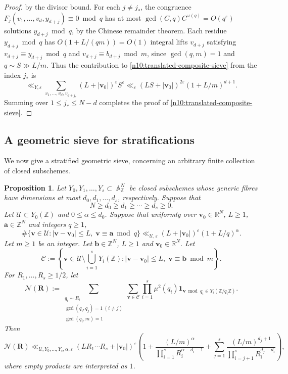 \documentclass[a4paper,11pt, twoside,reqno]{amsart}
\theoremstyle{plain}
\newtheorem{prop}[thm]{Proposition}
\theoremstyle{definition}
\theoremstyle{remark}
\newcommand{\bfa}{\bm{a}}
\newcommand{\bfb}{\bm{b}}
\newcommand{\bfv}{\bm{v}}
\newcommand{\ZZ}{\mathbb{Z}}
\newcommand{\RR}{\mathbb{R}}
\DeclareMathOperator{\A}{\mathbb{A}}
\newcommand{\ve}{\varepsilon}
\renewcommand{\le}{\leqslant}
\renewcommand{\ge}{\geqslant}
\numberwithin{equation}{section}
\begin{document}
\begin{proof}
by the divisor bound.
For each $j\ne j_*$, the congruence $F_j(v_1,\dots,v_d,y_{d+j}) \equiv 0\bmod{q}$
has at most $\gcd(C,q) C^{\omega(q)}=O(q^\ve)$ solutions $y_{d+j}\bmod{q}$,
by the Chinese remainder theorem.
Each residue $y_{d+j}\bmod{q}$ has $O(1 + L/(qm)) = O(1)$
integral lifts $v_{d+j}$ satisfying
$v_{d+j}\equiv y_{d+j}\bmod q$ and
$v_{d+j}\equiv b_{d+j}\bmod m$,
since $\gcd(q,m)=1$ and $q\sim S \gg L/m$.
Thus the contribution to \eqref{n10:translated-composite-sieve}
from the index $j_*$
is $$\ll_{Y,\ve} \sum_{v_1,\dots,v_d,v_{d+j_*}} (L+|\bfv_0|)^\ve S^\ve
\ll_\ve (LS+|\bfv_0|)^{2\ve} (1+L/m)^{d+1}.$$
Summing over $1\le j_*\le N-d$ completes the proof of \eqref{n10:translated-composite-sieve}.
\end{proof}


\subsection{A geometric sieve for stratifications}

We now give a stratified geometric sieve,
concerning an arbitrary finite collection of closed subschemes.

\begin{prop}\label{lem:stratified-composite-sieve}
Let $Y_0,Y_1,\ldots,Y_s\subset\A_\ZZ^N$ be closed subschemes
whose generic fibres have dimensions at most $d_0,d_1,\dots,d_s$,
respectively.
Suppose that
\[
 N\ge d_0\ge d_1\ge\cdots\ge d_s\ge0.
\]
Let $\mathcal U \subset Y_0(\ZZ)$ and $0 \le \alpha \le d_0$.
Suppose that
uniformly over $\bfv_0\in \RR^N$,
$L\ge 1$,
$\bfa\in\ZZ^N$
and integers $q\ge 1$,
\begin{equation}
\label{eq:stratified-progression-hypothesis}
\#\{\bfv\in \mathcal U:
|\bfv-\bfv_0|\le L,\;
\bfv\equiv\bfa\bmod q\}
\ll_{\mathcal U,\ve}
(L+|\bfv_0|)^\ve (1+L/q)^\alpha.
\end{equation}
Let $m\ge 1$ be an integer.
Let $\bfb\in\ZZ^N$,
$L\ge1$ and $\bfv_0\in\RR^N$.
Let
$${\textstyle \mathcal C
:= \left\{\bfv\in \mathcal U \setminus \bigcup_{i=1}^s Y_i(\ZZ):
|\bfv-\bfv_0|\le L,\;
\bfv\equiv\bfb\bmod m\right\}.}$$
For $R_1,\ldots,R_s \ge 1/2$, let
\[
\mathcal N(\bm R)
:= \sum_{\substack{q_i\sim R_i \\
\gcd(q_i,q_j)=1\ (i\ne j) \\ \gcd(q_i,m)=1}}
\sum_{\bfv\in\mathcal C}
\prod_{i=1}^s \mu^2(q_i)
\bm1_{\bfv\bmod q_i\in Y_i(\ZZ/q_i\ZZ)}.
\]
Then
\begin{equation}\label{eq:stratified-composite-sieve}
\mathcal N(\bm R)
\ll_{\mathcal U,Y_0,\dots,Y_s,\alpha,\ve}
(LR_1\cdots R_s + |\bfv_0|)^\ve
\left(1
+ \frac{(L/m)^\alpha}{\prod_{i=1}^s R_i^{\alpha-d_i-1}}
+ \sum_{j=1}^s \frac{(L/m)^{d_j+1}}{\prod_{i=j+1}^s R_i^{d_j-d_i}}
\right),
\end{equation}
where empty products are interpreted as $1$.
\end{prop}
\end{document}
